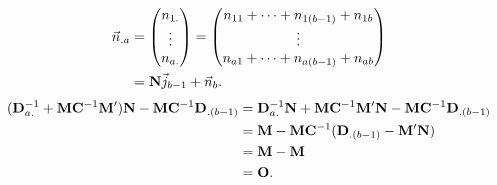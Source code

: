 \begin{align*}
    \vec{n}_{.a}
     & =\begin{pmatrix}
            n_{1.} \\
            \vdots \\
            n_{a.}
        \end{pmatrix}
    =\begin{pmatrix}
         n_{11}+\cdots+n_{1(b-1)}+n_{1b} \\
         \vdots                          \\
         n_{a1}+\cdots+n_{a(b-1)}+n_{ab}
     \end{pmatrix}               \\
     & =\mathbf{N}\vec{j}_{b-1}+\vec{n}_{b}.
\end{align*}
\begin{align*}
    (\mathbf{D}_{a.}^{-1}+\mathbf{M}\mathbf{C}^{-1}\mathbf{M}')\mathbf{N}-\mathbf{M}\mathbf{C}^{-1}\mathbf{D}_{.(b-1)}
     & =\mathbf{D}_{a.}^{-1}\mathbf{N}+\mathbf{M}\mathbf{C}^{-1}\mathbf{M}'\mathbf{N}-\mathbf{M}\mathbf{C}^{-1}\mathbf{D}_{.(b-1)} \\
     & =\mathbf{M}-\mathbf{M}\mathbf{C}^{-1}(\mathbf{D}_{.(b-1)}-\mathbf{M}'\mathbf{N})                                            \\
     & =\mathbf{M}-\mathbf{M}                                                                                                      \\
     & =\mathbf{O}.
\end{align*}
